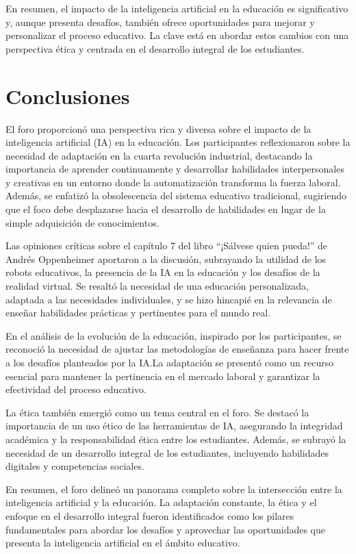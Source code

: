 \documentclass[letterpaper, 12pt]{article}
\begin{document}
En resumen, el impacto de la inteligencia artificial en la
educación es significativo y, aunque presenta desafíos,
también ofrece oportunidades para mejorar y personalizar el
proceso educativo. La clave está en abordar estos cambios
con una perspectiva ética y centrada en el desarrollo
integral de los estudiantes.

\section*{Conclusiones}

El foro proporcionó una perspectiva rica y diversa sobre el
impacto de la inteligencia artificial (IA) en la educación.
Los participantes reflexionaron sobre la necesidad de
adaptación en la cuarta revolución industrial, destacando
la importancia de aprender continuamente y desarrollar
habilidades interpersonales y creativas en un entorno donde
la automatización transforma la fuerza laboral. Además, se
enfatizó la obsolescencia del sistema educativo
tradicional, sugiriendo que el foco debe desplazarse hacia
el desarrollo de habilidades en lugar de la simple
adquisición de conocimientos.

Las opiniones críticas sobre el capítulo 7 del libro
``¡Sálvese quien pueda!'' de Andrés Oppenheimer aportaron a
la discusión, subrayando la utilidad de los robots
educativos, la presencia de la IA en la educación y los
desafíos de la realidad virtual. Se resaltó la necesidad de
una educación personalizada, adaptada a las necesidades
individuales, y se hizo hincapié en la relevancia de
enseñar habilidades prácticas y pertinentes para el mundo
real.

En el análisis de la evolución de la educación, inspirado
por los participantes, se reconoció la necesidad de ajustar
las metodologías de enseñanza para hacer frente a los
desafíos planteados por la IA.\@{}La adaptación se presentó
como un recurso esencial para mantener la pertinencia en el
mercado laboral y garantizar la efectividad del proceso
educativo.

La ética también emergió como un tema central en el foro.
Se destacó la importancia de un uso ético de las
herramientas de IA, asegurando la integridad académica y la
responsabilidad ética entre los estudiantes. Además, se
subrayó la necesidad de un desarrollo integral de los
estudiantes, incluyendo habilidades digitales y
competencias sociales.

En resumen, el foro delineó un panorama completo sobre la
intersección entre la inteligencia artificial y la
educación. La adaptación constante, la ética y el enfoque
en el desarrollo integral fueron identificados como los
pilares fundamentales para abordar los desafíos y
aprovechar las oportunidades que presenta la inteligencia
artificial en el ámbito educativo.

\newpage

\printbibliography
\end{document}
